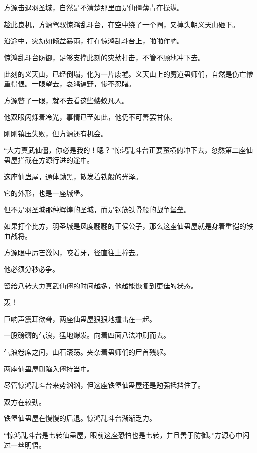 
\begin{this_body}



方源击退羽圣城，自然是不清楚那里面是仙僵薄青在操纵。

趁此良机，方源驾驭惊鸿乱斗台，在空中绕了一个圈，又掉头朝义天山砸下。

沿途中，灾劫如倾盆暴雨，打在惊鸿乱斗台上，啪啪作响。

惊鸿乱斗台防御，足够支撑此刻的灾劫打击，不管不顾地冲下去。

此刻的义天山，已经倒塌，化为一片废墟。义天山上的魔道蛊师们，自然是伤亡惨重得很。一眼望去，哀鸿遍野，惨不忍睹。

方源瞥了一眼，就不去看这些蝼蚁凡人。

他双眼闪烁着冷光，事情已至如此，他仍不可善罢甘休。

刚刚镇压失败，但方源还有机会。

“大力真武仙僵，你必是我的！嗯？”惊鸿乱斗台正要蛮横俯冲下去，忽然第二座仙蛊屋拦截在方源行进的途中。

这座仙蛊屋，通体黝黑，散发着铁般的光泽。

它的外形，也是一座城堡。

但不是羽圣城那种辉煌的圣城，而是钢筋铁骨般的战争堡垒。

如果打个比方，羽圣城是风度翩翩的王侯公子，那么这座仙蛊屋就是身着重铠的铁血战将。

方源眼中厉芒激闪，咬着牙，径直往上撞去。

他必须分秒必争。

留给八转大力真武仙僵的时间越多，他越能恢复到更佳的状态。

轰！

巨响声震耳欲聋，两座仙蛊屋狠狠地撞击在一起。

一股磅礴的气浪，猛地爆发。向着四面八法冲刷而去。

气浪卷席之间，山石滚荡。夹杂着蛊师们的尸首残躯。

两座仙蛊屋则陷入僵持当中。

尽管惊鸿乱斗台来势汹汹，但这座铁堡仙蛊屋还是勉强抵挡住了。

双方在较劲。

铁堡仙蛊屋在慢慢的后退。惊鸿乱斗台渐渐乏力。

“惊鸿乱斗台是七转仙蛊屋，眼前这座恐怕也是七转，并且善于防御。”方源心中闪过一丝明悟。


\end{this_body}
